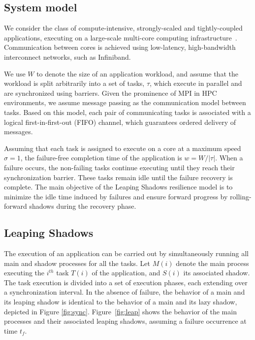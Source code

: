 \subsection {System model}

We consider the class of compute-intensive, strongly-scaled and tightly-coupled applications, executing on a large-scale multi-core computing infrastructure~\cite{doe_ascr_exascale_2011}. Communication between cores is achieved using low-latency, high-bandwidth interconnect networks, such as Infiniband. 

We use $W$ to denote the size of an application workload, and assume that the workload is split  arbitrarily into a set of tasks, $\tau$, which execute in parallel and are synchronized using barriers. Given the prominence of MPI in HPC environments, we assume message passing as the communication model between tasks. Based on this model, each pair of communicating tasks is associated with a logical first-in-first-out  (FIFO) channel, which guarantees ordered delivery of messages.

Assuming that each task is assigned to execute on a core at a maximum speed $\sigma=1$, the failure-free completion time of the application is $w = W/|\tau|$. When a failure occurs, the non-failing tasks continue executing until they reach their synchronization barrier. These tasks remain idle until the failure recovery is complete. The main objective of the Leaping Shadows resilience model is to minimize the idle time induced by failures and ensure forward progress by rolling-forward shadows during the recovery phase. 






\subsection {Leaping Shadows}

The execution of an application can be carried out by simultaneously running all main and shadow processes for all the tasks. Let $M(i)$ denote the main process executing the $i^{th}$ task $T(i)$ of the application, and $S(i)$ its associated shadow. The task execution is divided into a set of execution phases, each extending over a synchronization interval. In the absence of failure, the behavior of a main  and its leaping shadow is identical to the behavior of a main and its lazy shadow, depicted in Figure \ref{fig:sync}. Figure~\ref{fig:leap} shows the behavior of the main processes and their associated leaping shadows, assuming a failure occurrence at time $t_f$. 


